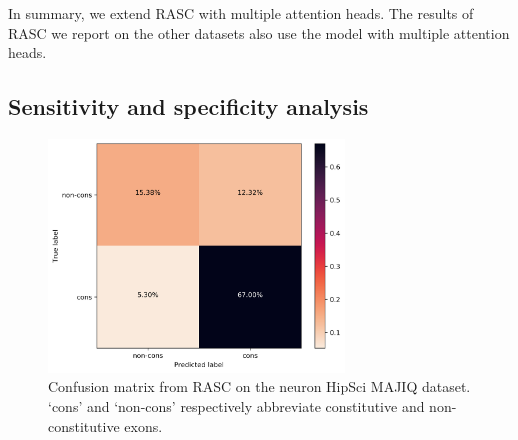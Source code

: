 In summary, we extend RASC with multiple attention heads. The results of RASC we report on the other datasets also use the model with multiple attention heads. 



\subsection{Sensitivity and specificity analysis}
\begin{figure}
	\centering\includegraphics[width=0.7\textwidth]{../visualizations/ch5-results/confusion_matrix.png} 
	\caption{Confusion matrix from RASC on the neuron HipSci MAJIQ dataset. `cons' and `non-cons' respectively abbreviate constitutive and non-constitutive exons. }
	\label{fig:confusion_matrix}
\end{figure}

